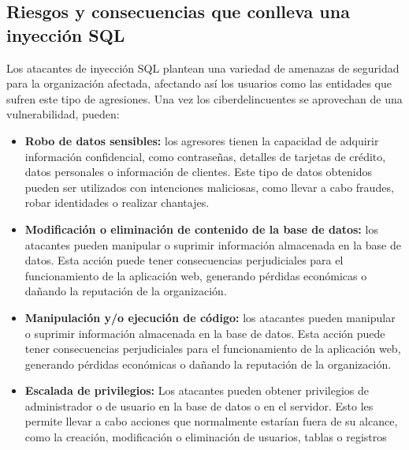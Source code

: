 \documentclass[11pt]{report}
\begin{document}
\subsection{Riesgos y consecuencias que conlleva una inyección SQL}
Los atacantes de inyección SQL plantean una variedad de amenazas de seguridad para la
organización afectada, afectando así los usuarios como las entidades que sufren este tipo
de agresiones. Una vez los ciberdelincuentes se aprovechan de una vulnerabilidad, pueden:
\begin{itemize}
\item \textbf{Robo de datos sensibles:} los agresores tienen la capacidad de adquirir información
confidencial, como contraseñas, detalles de tarjetas de crédito, datos personales o
información de clientes. Este tipo de datos obtenidos pueden ser utilizados con
intenciones maliciosas, como llevar a cabo fraudes, robar identidades o realizar
chantajes.
\item \textbf{Modificación o eliminación de contenido de la base de datos:} los atacantes pueden
manipular o suprimir información almacenada en la base de datos. Esta acción
puede tener consecuencias perjudiciales para el funcionamiento de la aplicación
web, generando pérdidas económicas o dañando la reputación de la organización.
\item \textbf{Manipulación y/o ejecución de código:} los atacantes pueden manipular o suprimir
información almacenada en la base de datos. Esta acción puede tener
consecuencias perjudiciales para el funcionamiento de la aplicación web, generando
pérdidas económicas o dañando la reputación de la organización.
\item \textbf{Escalada de privilegios:} Los atacantes pueden obtener privilegios de administrador o
de usuario en la base de datos o en el servidor. Esto les permite llevar a cabo
acciones que normalmente estarían fuera de su alcance, como la creación,
modificación o eliminación de usuarios, tablas o registros
\end{itemize}
\end{document}
